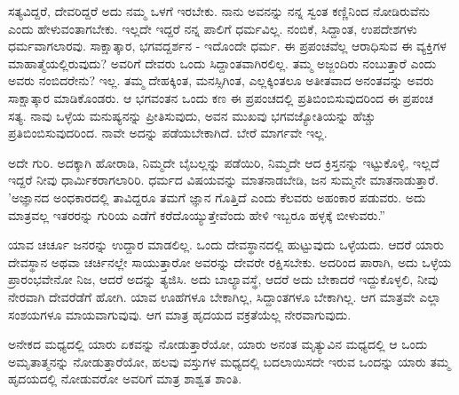 ಸತ್ಯವಿದ್ದರೆ, ದೇವರಿದ್ದರೆ ಅದು ನಮ್ಮ ಒಳಗೆ ಇರಬೇಕು. ನಾನು ಅವನನ್ನು ನನ್ನ ಸ್ವಂತ ಕಣ್ಣಿನಿಂದ ನೋಡಿರುವೆನು ಎಂದು ಹೇಳುವಂತಾಗಬೇಕು. ಇಲ್ಲದೇ ಇದ್ದರೆ ನನ್ನ ಪಾಲಿಗೆ ಧರ್ಮವಿಲ್ಲ. ನಂಬಿಕೆ, ಸಿದ್ದಾಂತ, ಉಪದೇಶಗಳು ಧರ್ಮವಾಗಲಾರವು. ಸಾಕ್ಷಾತ್ಕಾರ, ಭಗವದ್ದರ್ಶನ - ಇದೊಂದೇ ಧರ್ಮ. ಈ ಪ್ರಪಂಚವೆಲ್ಲ ಆರಾಧಿಸುವ ಈ ವ್ಯಕ್ತಿಗಳ ಮಾಹಾತ್ಮೆಯಲ್ಲಿರುವುದು? ಅವರಿಗೆ ದೇವರು ಒಂದು ಸಿದ್ದಾಂತವಾಗಿರಲಿಲ್ಲ. ತಮ್ಮ ಅಜ್ಜಂದಿರು ನಂಬುತ್ತಾರೆ ಎಂದು ಅವರು ನಂಬಿದರೇನು? ಇಲ್ಲ. ತಮ್ಮ ದೇಹಕ್ಕಿಂತ, ಮನಸ್ಸಿಗಿಂತ, ಎಲ್ಲಕ್ಕಿಂತಲೂ ಅತೀತವಾದ ಅನಂತವನ್ನು ಅವರು ಸಾಕ್ಷಾತ್ಕಾರ ಮಾಡಿಕೊಂಡರು. ಆ ಭಗವಂತನ ಒಂದು ಕಣ ಈ ಪ್ರಪಂಚದಲ್ಲಿ ಪ್ರತಿಬಿಂಬಿಸುವುದರಿಂದ ಈ ಪ್ರಪಂಚ ಸತ್ಯ. ನಾವು ಒಳ್ಳೆಯ ಮನುಷ್ಯನನ್ನು ಪ್ರೀತಿಸುವುದು, ಅವನ ಮುಖವು ಭಗವಜ್ಯೋತಿಯನ್ನು ಹೆಚ್ಚು ಪ್ರತಿಬಿಂಬಿಸುವುದರಿಂದ. ನಾವೇ ಅದನ್ನು ಪಡೆಯಬೇಕಾಗಿದೆ. ಬೇರೆ ಮಾರ್ಗವೇ ಇಲ್ಲ.

ಅದೇ ಗುರಿ. ಅದಕ್ಕಾಗಿ ಹೋರಾಡಿ, ನಿಮ್ಮದೇ ಬೈಬಲ್ಲನ್ನು ಪಡೆಯಿರಿ, ನಿಮ್ಮದೇ ಆದ ಕ್ರಿಸ್ತನನ್ನು ಇಟ್ಟುಕೊಳ್ಳಿ, ಇಲ್ಲದೆ ಇದ್ದರೆ ನೀವು ಧಾರ್ಮಿಕರಾಗಲಾರಿರಿ. ಧರ್ಮದ ವಿಷಯವನ್ನು ಮಾತನಾಡಬೇಡಿ, ಜನ ಸುಮ್ಮನೇ ಮಾತನಾಡುತ್ತಾರೆ. 'ಅಜ್ಞಾನದ ಅಂಧಕಾರದಲ್ಲಿ ತಾವಿದ್ದರೂ ತಮಗೆ ಜ್ಞಾನ ಗೊತ್ತಿದೆ ಎಂದು ಕೆಲವರು ಅಹಂಕಾರ ಪಡುವರು. ಅದು ಮಾತ್ರವಲ್ಲ ಇತರರನ್ನು ಗುರಿಯ ಎಡೆಗೆ ಕರೆದೊಯ್ಯುತ್ತೇವೆಂದು ಹೇಳಿ ಇಬ್ಬರೂ ಹಳ್ಳಕ್ಕೆ ಬೀಳುವರು.”

ಯಾವ ಚರ್ಚೂ ಜನರನ್ನು ಉದ್ದಾರ ಮಾಡಲಿಲ್ಲ. ಒಂದು ದೇವಸ್ಥಾನದಲ್ಲಿ ಹುಟ್ಟುವುದು ಒಳ್ಳೆಯದು. ಆದರೆ ಯಾರು ದೇವಸ್ಥಾನ ಅಥವಾ ಚರ್ಚಿನಲ್ಲೇ ಸಾಯುತ್ತಾರೋ ಅವರನ್ನು ದೇವರೇ ರಕ್ಷಿಸಬೇಕು. ಅದರಿಂದ ಪಾರಾಗಿ, ಅದು ಒಳ್ಳೆಯ ಪ್ರಾರಂಭವೇನೋ ನಿಜ, ಆದರೆ ಅದನ್ನು ತ್ಯಜಿಸಿ. ಅದು ಬಾಲ್ಯಾವಸ್ಥೆ, ಆದರೆ ಅದು ಬೇಕಾದರೆ ಇದ್ದುಕೊಳ್ಳಲಿ, ನೀವು ನೇರವಾಗಿ ದೇವರೆಡೆಗೆ ಹೋಗಿ. ಯಾವ ಊಹೆಗಳೂ ಬೇಕಾಗಿಲ್ಲ, ಸಿದ್ದಾಂತಗಳೂ ಬೇಕಾಗಿಲ್ಲ. ಆಗ ಮಾತ್ರವೇ ಎಲ್ಲಾ ಸಂಶಯಗಳೂ ಮಾಯವಾಗುವುವು. ಆಗ ಮಾತ್ರ ಹೃದಯದ ವಕ್ರತೆಯೆಲ್ಲ ನೇರವಾಗುವುದು.

ಅನೇಕದ ಮಧ್ಯದಲ್ಲಿ ಯಾರು ಏಕವನ್ನು ನೋಡುತ್ತಾರೆಯೋ, ಯಾರು ಅನಂತ ಮೃತ್ಯುವಿನ ಮಧ್ಯದಲ್ಲಿ ಆ ಒಂದು ಅಮೃತಾತ್ಮನನ್ನು ನೋಡುತ್ತಾರೆಯೋ, ಹಲವು ವಸ್ತುಗಳ ಮಧ್ಯದಲ್ಲಿ ಬದಲಾಯಿಸದೇ ಇರುವ ಒಂದನ್ನು ಯಾರು ತಮ್ಮ ಹೃದಯದಲ್ಲಿ ನೋಡುವರೋ ಅವರಿಗೆ ಮಾತ್ರ ಶಾಶ್ವತ ಶಾಂತಿ.

